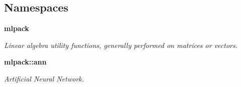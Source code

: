 \subsection*{Namespaces}
\begin{DoxyCompactItemize}
\item 
 {\bf mlpack}
\begin{DoxyCompactList}\small\item\em Linear algebra utility functions, generally performed on matrices or vectors. \end{DoxyCompactList}\item 
 {\bf mlpack\+::ann}
\begin{DoxyCompactList}\small\item\em Artificial Neural Network. \end{DoxyCompactList}\end{DoxyCompactItemize}
